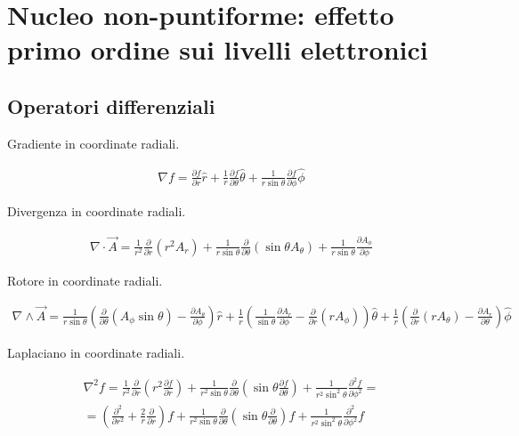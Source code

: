 \documentclass[main.tex]{subfiles}
\begin{document}
\section{Nucleo non-puntiforme: effetto primo ordine sui livelli elettronici}


\subsection{Operatori differenziali}

Gradiente in coordinate radiali.

\begin{align*}
\nabla f=\frac{\partial f}{\partial r}\hat{r}+\frac{1}{r}\frac{\partial f}{\partial \theta}\hat{\theta}+\frac{1}{r\sin{\theta}}\frac{\partial f}{\partial \phi}\hat{\phi}
\end{align*}

Divergenza in coordinate radiali.

\begin{align*}
\nabla\cdot\vec{A}=\frac{1}{r^2}\frac{\partial}{\partial r}(r^2A_r)+\frac{1}{r\sin{\theta}}\frac{\partial }{\partial \theta}(\sin{\theta}A_{\theta})+\frac{1}{r\sin{\theta}}\frac{\partial A_{\phi}}{\partial \phi}
\end{align*}

Rotore in coordinate radiali.

\begin{align*}
\nabla\wedge\vec{A}=\frac{1}{r\sin{\theta}}(\frac{\partial}{\partial \theta}(A_{\phi}\sin{\theta})-\frac{\partial A_{\theta}}{\partial \phi})\hat{r}+\frac{1}{r}(\frac{1}{\sin{\theta}}\frac{\partial A_r}{\partial \phi}-\frac{\partial}{\partial r}(rA_{\phi}))\hat{\theta}+\frac{1}{r}(\frac{\partial}{\partial r}(rA_{\theta})-\frac{\partial A_r}{\partial \theta})\hat{\phi}
\end{align*}

Laplaciano in coordinate radiali.

\begin{align*}
\nabla^2f=\frac{1}{r^2}\frac{\partial}{\partial r}(r^2\frac{\partial f}{\partial r})+\frac{1}{r^2\sin{\theta}}\frac{\partial}{\partial \theta}(\sin{\theta}\frac{\partial f}{\partial \theta})+\frac{1}{r^2\sin^2{\theta}}\frac{\partial^2f}{\partial \phi^2}=\\
=(\frac{\partial^2}{\partial r^2}+\frac{2}{r}\frac{\partial}{\partial r})f+\frac{1}{r^2\sin{\theta}}\frac{\partial}{\partial\theta}(\sin{\theta}\frac{\partial}{\partial \theta})f+\frac{1}{r^2\sin^2{\theta}}\frac{\partial^2}{\partial \phi^2}f
\end{align*}
\end{document}
